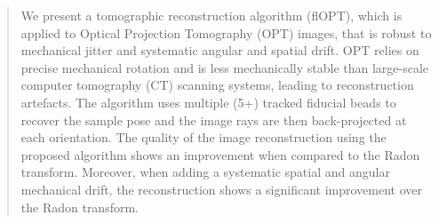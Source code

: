 \documentclass{osa-article}
\begin{document}
\fi

\begin{abstract}
  We present a tomographic reconstruction algorithm (flOPT), which is applied to Optical Projection Tomography (OPT) images, that is robust to mechanical jitter and systematic angular and spatial drift.
  OPT relies on precise mechanical rotation and is less mechanically stable than large-scale computer tomography (CT) scanning systems, leading to reconstruction artefacts.
  The algorithm uses multiple (5+) tracked fiducial beads to recover the sample pose and the image rays are then back-projected at each orientation.
  The quality of the image reconstruction using the proposed algorithm shows an improvement when compared to the Radon transform.
  Moreover, when adding a systematic spatial and angular mechanical drift, the reconstruction shows a significant improvement over the Radon transform.
\end{abstract}



%
\end{document}

